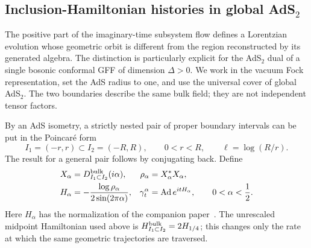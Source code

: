 \documentclass[a4paper,11pt]{article}
\theoremstyle{definition}
\begin{document}
\subsection{Inclusion-Hamiltonian histories in global
\texorpdfstring{AdS$_2$}{AdS2}}
\label{subsec:ads2-inclusion-histories}



The positive part of the imaginary-time subsystem flow defines a
Lorentzian evolution whose geometric orbit is different from the
region reconstructed by its generated algebra. The distinction is
particularly explicit for the AdS$_2$ dual of a single bosonic
conformal GFF of dimension $\Delta>0$. We work in the vacuum Fock
representation, set the AdS radius to one, and use the universal cover
of global AdS$_2$. The two boundaries describe the same bulk field;
they are not independent tensor factors.

By an AdS isometry, a strictly nested pair of proper boundary intervals
can be put in the Poincar\'e form
\begin{equation}
 I_1=(-r,r)\subset I_2=(-R,R),
 \qquad 0<r<R,
 \qquad \ell=\log(R/r).
 \label{eq:ads2-history-pair}
\end{equation}
The result for a general pair follows by conjugating back. Define
\begin{equation}
 \begin{aligned}
 X_\alpha&=D^{\rm bulk}_{I_1\subset I_2}(i\alpha),
 &\rho_\alpha&=X_\alpha^*X_\alpha,\\
 H_\alpha&=-\frac{\log\rho_\alpha}{2\sin(2\pi\alpha)},
 &\gamma_t^\alpha&=\operatorname{Ad}e^{itH_\alpha},
 \qquad 0<\alpha<\frac12 .
 \end{aligned}
 \label{eq:ads2-history-dynamics}
\end{equation}
Here $H_\alpha$ has the normalization of the companion
paper~\cite{companionQEC}. The unrescaled midpoint Hamiltonian used above
is $H^{\rm bulk}_{I_1\subset I_2}=2H_{1/4}$; this changes only the
rate at which the same geometric trajectories are traversed.
\end{document}
